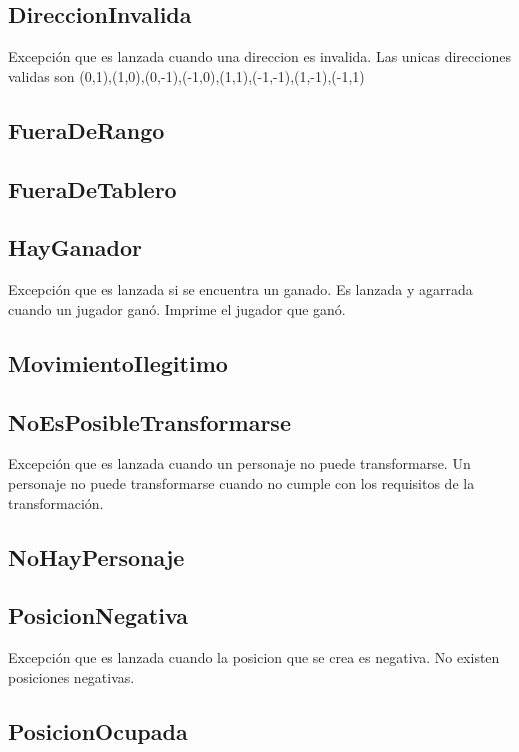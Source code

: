 \documentclass[a4paper]{article}
\begin{document}
\subsection{DireccionInvalida}
Excepción que es lanzada cuando una direccion es invalida. Las unicas direcciones validas son (0,1),(1,0),(0,-1),(-1,0),(1,1),(-1,-1),(1,-1),(-1,1)

\subsection{FueraDeRango} 

\subsection{FueraDeTablero} 

\subsection{HayGanador}
Excepción que es lanzada si se encuentra un ganado. Es lanzada y agarrada cuando un jugador ganó. Imprime el jugador que ganó.

\subsection{MovimientoIlegitimo}

\subsection{NoEsPosibleTransformarse}
Excepción que es lanzada cuando un personaje no puede transformarse. Un personaje no puede transformarse cuando no cumple con los requisitos de la transformación.

\subsection{NoHayPersonaje}

\subsection{PosicionNegativa}
Excepción que es lanzada cuando la posicion que se crea es negativa. No existen posiciones negativas.


\subsection{PosicionOcupada}
\end{document}
